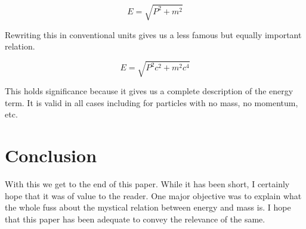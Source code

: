\documentclass[12pt]{article}
\numberwithin{equation}{section}
\theoremstyle{plain}
\theoremstyle{definition}
\begin{document}
\begin{equation}
    E = \sqrt{P^2+m^2}
    \label{eq:epm-relation}
\end{equation}

Rewriting this in conventional units gives us a less famous but equally important relation. 

\begin{equation}
    E = \sqrt{P^2c^2+m^2c^4}
    \label{eq:epm-relation-conventional}
\end{equation}

This holds significance because it gives us a complete description of the energy term. It is valid in all cases including for particles with no mass, no momentum, etc.

\section{Conclusion}

With this we get to the end of this paper. While it has been short, I certainly hope that it was of value to the reader. One major objective was to explain what the whole fuss about the mystical relation between energy and mass is. I hope that this paper has been adequate to convey the relevance of the same.
\end{document}
